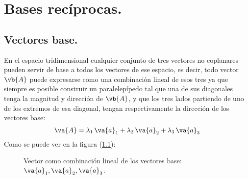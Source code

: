 \chapter{Bases recíprocas.}
\section{Vectores base.}
En el espacio tridimensional cualquier conjunto de tres vectores no coplanares pueden servir de base a todos los vectores de ese espacio, es decir, todo vector $\vb{A}$ puede expresarse como una combinación lineal de esos tres ya que siempre es posible construir un paralelepípedo tal que una de sus diagonales tenga la magnitud y dirección de $\vb{A}$, y que los tres lados partiendo de uno de los extremos de esa diagonal, tengan respectivamente la dirección de los vectores base:
\begin{align*}
\va{A} = \lambda_{1} \, \va{a}_{1} + \lambda_{2} \, \va{a}_{2} + \lambda_{3} \, \va{a}_{3}
\end{align*}
Como se puede ver en la figura (\ref{fig:figura_01}):
\begin{figure}[H]
    \centering
    
    \caption{Vector como combinación lineal de los vectores base: $\va{a}_{1}, \va{a}_{2}, \va{a}_{3}$.}
    \label{fig:figura_01}
\end{figure}
